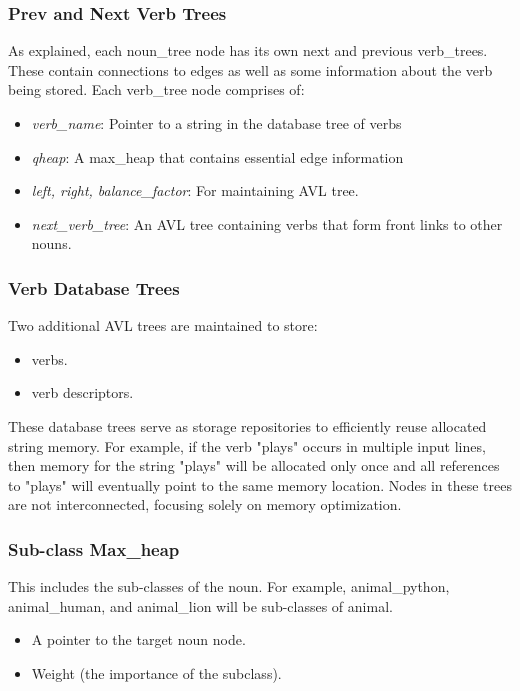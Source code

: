 \documentclass[conference]{IEEEtran}
\begin{document}

\subsubsection{\textbf{Prev and Next Verb Trees}}
As explained, each noun\_tree node has its own next and previous verb\_trees. These contain connections to edges as well as some information about the verb being stored. Each verb\_tree node comprises of:

\begin{itemize}

    \item \textit{verb\_name}: Pointer to a string in the database tree of verbs
    \item \textit{qheap}: A max\_heap that contains essential edge information
    \item \textit{left, right, balance\_factor}: For maintaining AVL tree. 
    \item \textit{next\_verb\_tree}: An AVL tree containing verbs that form front links to other nouns.
    
\end{itemize}

\subsubsection{\textbf{Verb Database Trees}}
Two additional AVL trees are maintained to store:
\begin{itemize}
    \item verbs.
    \item verb descriptors.
\end{itemize}
These database trees serve as storage repositories to efficiently reuse allocated string memory. 
For example, if the verb "plays" occurs in multiple input lines, then memory for the string "plays" will be allocated only once and all references to "plays" will eventually point to the same memory location. 
Nodes in these trees are not interconnected, focusing solely on memory optimization.

\subsubsection{\textbf{Sub-class Max\_heap}}
This includes the sub-classes of the noun. For example, animal\_python, animal\_human, and animal\_lion will be sub-classes of animal. 
\begin{itemize}
    \item A pointer to the target noun node.
    \item Weight (the importance of the subclass).
\end{itemize}
\end{document}
